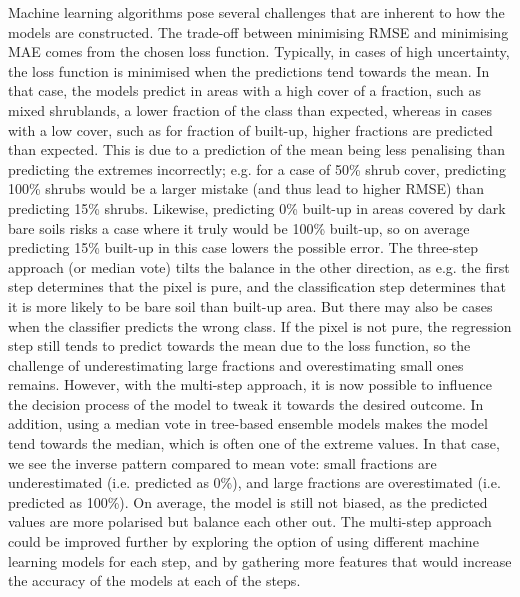 \documentclass[review,authoryear,3p]{elsarticle}
\begin{document}
Machine learning algorithms pose several challenges that are inherent to how the models are constructed.
The trade-off between minimising \gls{RMSE} and minimising \gls{MAE} comes from the chosen loss function.
Typically, in cases of high uncertainty, the loss function is minimised when the predictions tend towards the mean.
In that case, the models predict in areas with a high cover of a fraction, such as mixed shrublands, a lower fraction of the class than expected, whereas in cases with a low cover, such as for fraction of built-up, higher fractions are predicted than expected.
This is due to a prediction of the mean being less penalising than predicting the extremes incorrectly; e.g. for a case of 50\% shrub cover, predicting 100\% shrubs would be a larger mistake (and thus lead to higher \gls{RMSE}) than predicting 15\% shrubs.
Likewise, predicting 0\% built-up in areas covered by dark bare soils risks a case where it truly would be 100\% built-up, so on average predicting 15\% built-up in this case lowers the possible error.
The three-step approach (or median vote) tilts the balance in the other direction, as e.g. the first step determines that the pixel is pure, and the classification step determines that it is more likely to be bare soil than built-up area.
But there may also be cases when the classifier predicts the wrong class.
If the pixel is not pure, the regression step still tends to predict towards the mean due to the loss function, so the challenge of underestimating large fractions and overestimating small ones remains.
However, with the multi-step approach, it is now possible to influence the decision process of the model to tweak it towards the desired outcome.
In addition, using a median vote in tree-based ensemble models makes the model tend towards the median, which is often one of the extreme values.
In that case, we see the inverse pattern compared to mean vote: small fractions are underestimated (i.e. predicted as 0\%), and large fractions are overestimated (i.e. predicted as 100\%).
On average, the model is still not biased, as the predicted values are more polarised but balance each other out.
The multi-step approach could be improved further by exploring the option of using different machine learning models for each step, and by gathering more features that would increase the accuracy of the models at each of the steps.
\end{document}
